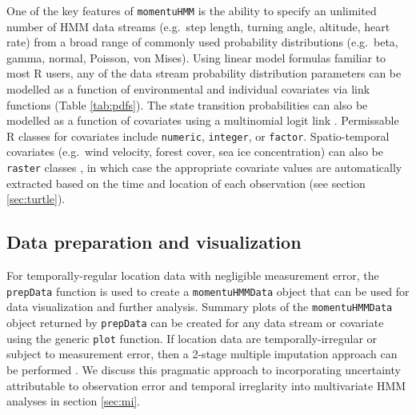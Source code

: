 \documentclass[12pt]{article}\usepackage[]{graphicx}\usepackage[]{color}
\begin{document}
One of the key features of \verb|momentuHMM| is the ability to specify an unlimited number of HMM data streams (e.g.\ step length, turning angle, altitude, heart rate) from a broad range of commonly used probability distributions (e.g.\ beta, gamma, normal, Poisson, von Mises). Using linear model formulas familiar to most R users, any of the data stream probability distribution parameters can be modelled as a function of environmental and individual covariates via link functions (Table \ref{tab:pdfs}). %
The state transition probabilities can also be modelled as a function of covariates using a multinomial logit link \citep[e.g.][]{MichelotEtAl2016}. Permissable R classes for covariates include \verb|numeric|, \verb|integer|, or \verb|factor|. %
Spatio-temporal covariates (e.g.\ wind velocity, forest cover, sea ice concentration) can also be \verb|raster| classes \citep{Hijmans2016}, in which case the appropriate covariate values are automatically extracted based on the time and location of each observation (see section \ref{sec:turtle}).

\subsection{Data preparation and visualization}
For temporally-regular location data with negligible measurement error, the \verb|prepData| function is used to create a \verb|momentuHMMData| object that can be used for data visualization and further analysis. Summary plots of the \verb|momentuHMMData| object returned by \verb|prepData| can be created for any data stream or covariate using the generic \verb|plot| function. If location data are temporally-irregular or subject to measurement error, then a 2-stage multiple imputation approach can be performed \citep{McClintock2017}. We discuss this pragmatic approach to incorporating uncertainty attributable to observation error and temporal irreglarity into multivariate HMM analyses in section \ref{sec:mi}.
\end{document}
